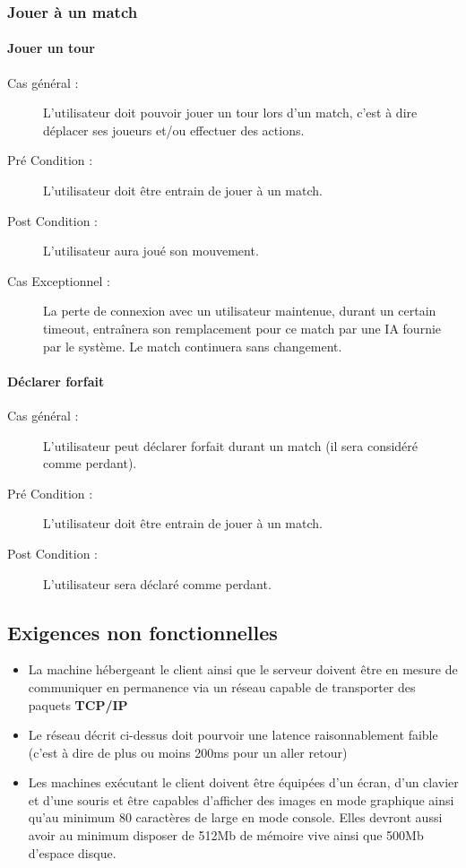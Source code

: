 \documentclass[a4paper]{article}
\begin{document}
\subsubsection{Jouer à un match}
\paragraph{Jouer un tour}
\begin{description}
    \item[Cas général :] L'\gls{utilisateur} doit pouvoir jouer un tour lors d'un match, c'est à dire déplacer ses \glspl{joueur} et/ou effectuer des actions.
    \item[Pré Condition  :] L'\gls{utilisateur} doit être entrain de jouer à un match.
    \item[Post Condition :] L'\gls{utilisateur} aura joué son mouvement.
    \item[Cas Exceptionnel :] La perte de connexion avec un \gls{utilisateur} maintenue, durant un certain timeout, entraînera son remplacement pour ce match par une IA fournie par le système. Le match continuera sans changement.
\end{description}
\paragraph{Déclarer forfait}
\begin{description}
\item[Cas général :] L'\gls{utilisateur} peut déclarer forfait durant un match (il sera considéré comme perdant).
\item[Pré Condition  :] L'\gls{utilisateur} doit être entrain de jouer à un match.
\item[Post Condition :] L'\gls{utilisateur} sera déclaré comme perdant.
\end{description}


\subsection{Exigences non fonctionnelles}
\begin{itemize}
\item La machine hébergeant le \gls{client} ainsi que le \gls{serveur} doivent être en mesure de communiquer en permanence via un réseau capable de transporter des paquets \textbf{TCP/IP}
\item Le réseau décrit ci-dessus doit pourvoir une latence raisonnablement faible (c'est à dire de plus ou moins 200ms pour un aller retour)
\item Les machines exécutant le \gls{client} doivent être équipées d'un écran, d'un clavier et d'une souris et être capables d'afficher des images en mode graphique ainsi qu'au minimum 80 caractères de large en mode console. Elles devront aussi avoir au minimum disposer de 512Mb de mémoire vive ainsi que 500Mb d'espace disque.
\end{itemize}
\end{document}
